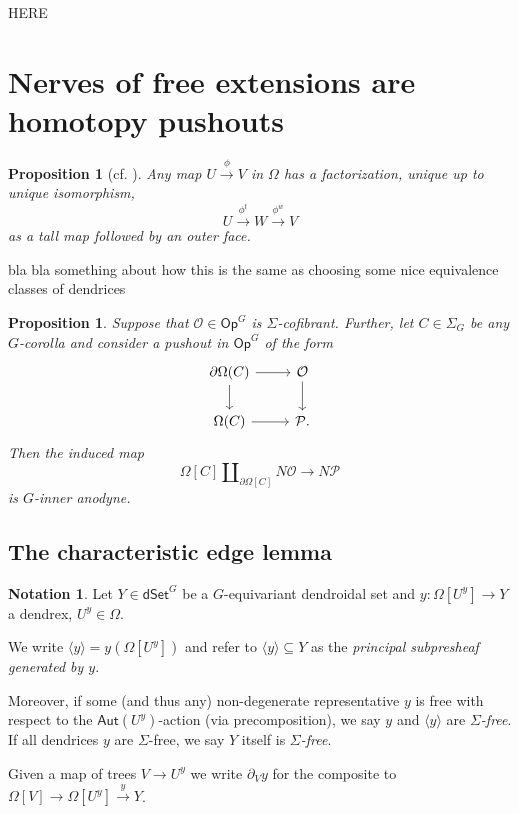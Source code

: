 \documentclass[a4paper,10pt
,draft
]{article}%
\numberwithin{equation}{section}
\numberwithin{figure}{section}
\newtheorem{proposition}[equation]{Proposition}%
\theoremstyle{definition} %
\newtheorem{notation}[equation]{Notation}%
\newcommand{\1}{\ensuremath{\mathbbm 1}}%
\begin{document}
{\color{red} HERE}


 
\section{Nerves of free extensions are homotopy pushouts}
\label{KEYRES SEC}


\begin{proposition}[{cf. \cite[Prop. 3.31]{BP_geo}}]
	\label{TALLOUTER_PROP}
	Any map $U \xrightarrow{\phi} V$ in $\Omega$ has a factorization, unique up to unique isomorphism,
	\[
	U \xrightarrow{\phi^t} W \xrightarrow{\phi^w} V
	\]
	as a tall map followed by an outer face.
\end{proposition}




{\color{red} bla bla something about how this is the same as choosing some nice equivalence classes of dendrices}





\begin{proposition}\label{KEYPR PROP OLD}
	Suppose that $\mathcal{O} \in \mathsf{Op}^{G}$
	is $\Sigma$-cofibrant.
	Further, let $C \in \Sigma_G$ be any $G$-corolla and consider 
	a pushout in $\mathsf{Op}^{G}$ of the form
	\begin{equation}\label{PUSHOUTPROP EQ}
	\begin{tikzcd}
	\partial \Omega(C) \ar{r} \ar{d} & \mathcal{O} \ar{d}
	\\
	\Omega(C) \ar{r} & \mathcal{P}.
	\end{tikzcd}
	\end{equation}
	Then the induced map
	\begin{equation}\label{ANODYNE MAP}
	\Omega[C] \amalg_{\partial \Omega[C]} N\mathcal{O} \to N\mathcal{P}
	\end{equation}
	is $G$-inner anodyne.
\end{proposition}


\subsection{The characteristic edge lemma}


\begin{notation}
	Let $Y \in \mathsf{dSet}^G$ be a $G$-equivariant dendroidal set and 
	$y \colon \Omega[U^y] \to Y$
	a dendrex, $U^y \in \Omega$.
	
	We write $\langle y \rangle = y\left(  \Omega[U^y] \right)$
	and refer to
	$\langle y \rangle \subseteq Y$
	as the \emph{principal subpresheaf generated by $y$}.
	
	Moreover, if some (and thus any)
	non-degenerate representative $y$ is free 
	with respect to the $\mathsf{Aut}(U^y)$-action (via precomposition),
	we say $y$ and $\langle y \rangle$ are \emph{$\Sigma$-free}.
	If all dendrices $y$ are $\Sigma$-free, we say $Y$ itself is \textit{$\Sigma$-free}.
	
	Given a map of trees $V \to U^y$ we write $\partial_V y$ for the composite to $\Omega[V] \to \Omega[U^y] \xrightarrow{y} Y$.
\end{notation}
\end{document}
